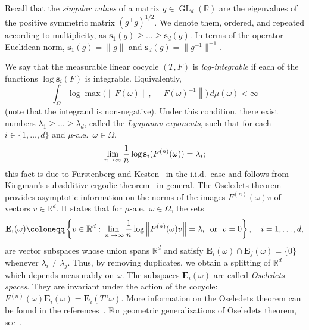 \documentclass[10pt]{amsart}
\theoremstyle{definition}\newtheorem{defi}[theo]{Definition}\newtheorem{rema}[theo]{Remark}\newtheorem{exam}[theo]{Example}\newtheorem{exem}[theo]{Example}\newtheorem{nota}[theo]{Notation}
\newcommand{\R}{\mathbb{R}}
\newcommand{\E}{\mathbf{E}}
\newcommand{\bfs}{\mathbf{s}}
\DeclareMathOperator{\GL}{GL}
\renewcommand*{\to}{\mathchoice{\longrightarrow}{\rightarrow}{\rightarrow}{\rightarrow}}
\begin{document}
Recall that the \emph{singular values} of a matrix $g \in \GL_d(\R)$ are the eigenvalues of the positive symmetric matrix $(g^\top g)^{1/2}$. We denote them, ordered, and repeated according to multiplicity, as $\bfs_1(g) \ge \dots \ge \bfs_d(g)$. In terms of the operator Euclidean norm, $\bfs_1(g) = \|g\|$ and $\bfs_d(g) = \|g^{-1}\|^{-1}$.

We say that the measurable linear cocycle $(T,F)$ is \emph{log-integrable} if each of the functions $\log \bfs_i(F)$ is integrable. Equivalently,
\begin{equation}\label{e.log-integrable_cocycle}
\int_\Omega \log \max \bigl(\|F(\omega)\|,\; \left\|F(\omega)^{-1}\right\| \bigr) \, d\mu(\omega) < \infty
\end{equation}
(note that the integrand is non-negative). Under this condition, there exist numbers $\lambda_1 \ge \dots \ge \lambda_d$, called the \emph{Lyapunov exponents}, such that for each $i \in \{1,\dots, d\}$ and $\mu$-a.e.~$\omega \in \Omega$,
\begin{equation}
\lim_{n \to \infty} \frac{1}{n} \log \bfs_i(F^{(n)}(\omega)) = \lambda_i ;
\end{equation}
this fact is due to Furstenberg and Kesten~\cite{FK} in the i.i.d.\ case and follows from Kingman's subadditive ergodic theorem~\cite{kingman} in general. The Oseledets theorem~\cite{oseledets} provides asymptotic information on the norms of the images $F^{(n)}(\omega) v$ of vectors $v \in \R^d$. It states that for $\mu$-a.e.\ $\omega \in \Omega$, the sets
\begin{equation}
\E_i(\omega) \coloneqq \left\{ v \in\R^d : \lim_{|n| \to \infty} \frac{1}{n} \log \left\| F^{(n)}(\omega) v\right\| = \lambda_i \;\text{ or }\; v=0\right\}, \quad i=1, \dots,d,
\end{equation}
are vector subspaces whose union spans $\R^d$ and satisfy $\E_i(\omega) \cap \E_j(\omega) = \{0\}$ whenever $\lambda_i \neq \lambda_j$. Thus, by removing duplicates, we obtain a splitting of $\R^d$ which depends measurably on $\omega$. The subspaces $\E_i(\omega)$ are called \emph{Oseledets spaces}. They are invariant under the action of the cocycle: $F^{(n)}(\omega) \E_i(\omega) = \E_i(T^n \omega)$. More information on the Oseledets theorem can be found in the references~\cite{arnold,barreira,ledrappier,Viana}. For geometric generalizations of Oseledets theorem, see~\cite{filip}.
\end{document}
